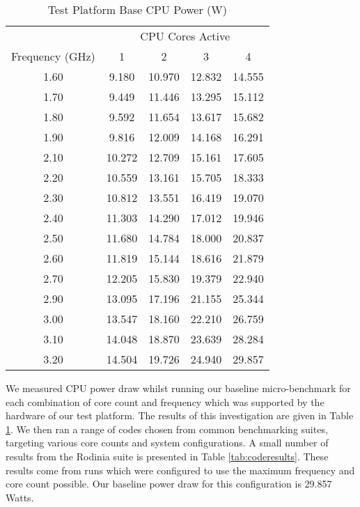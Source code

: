 \begin{table}
\centering
\small
\begin{tabular}{@{}ccccc@{}} \toprule
&\multicolumn{4}{c}{CPU Cores Active} \\ \cmidrule(r){2-5}
Frequency (GHz) & 1 & 2 & 3 & 4 \\ \midrule 
1.60 & 9.180 & 10.970 & 12.832 & 14.555 \\ 
1.70 & 9.449 & 11.446 & 13.295 & 15.112 \\ 
1.80 & 9.592 & 11.654 & 13.617 & 15.682 \\ 
1.90 & 9.816 & 12.009 & 14.168 & 16.291 \\ 
2.10 & 10.272 & 12.709 & 15.161 & 17.605 \\ 
2.20 & 10.559 & 13.161 & 15.705 & 18.333 \\ 
2.30 & 10.812 & 13.551 & 16.419 & 19.070 \\ 
2.40 & 11.303 & 14.290 & 17.012 & 19.946 \\ 
2.50 & 11.680 & 14.784 & 18.000 & 20.837 \\ 
2.60 & 11.819 & 15.144 & 18.616 & 21.879 \\ 
2.70 & 12.205 & 15.830 & 19.379 & 22.940 \\ 
2.90 & 13.095 & 17.196 & 21.155 & 25.344 \\ 
3.00 & 13.547 & 18.160 & 22.210 & 26.759 \\ 
3.10 & 14.048 & 18.870 & 23.639 & 28.284 \\ 
3.20 & 14.504 & 19.726 & 24.940 & 29.857 \\ 
\bottomrule
\end{tabular}
   \vspace{0.5\baselineskip}
\caption{Test Platform Base CPU Power (W)}
\label{tab:baseline}
\end{table} 

We measured CPU power draw whilst running our baseline micro-benchmark for each combination of core count and frequency which was supported by the hardware of our test platform. The results of this investigation are given in Table \ref{tab:baseline}. We then ran a range of codes chosen from common benchmarking suites, targeting various core counts and system configurations. A small number of results from the Rodinia suite is presented in Table \ref{tab:coderesults}. These results come from runs which were configured to use the maximum frequency and core count possible. Our baseline power draw for this configuration is 29.857 Watts.


